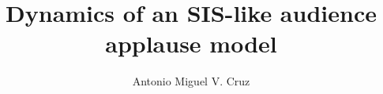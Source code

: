 \documentclass[]{nip} %
\title{Dynamics of an SIS-like audience applause model} %
\author{Antonio Miguel V. Cruz} %
\begin{document}
\maketitle %
\makePrelim %







\appendix









\end{document}
